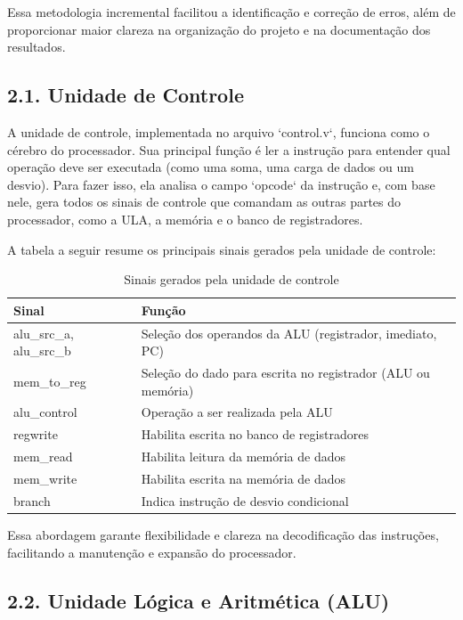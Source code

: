 \documentclass[12pt, a4paper]{article}
\begin{document}
Essa metodologia incremental facilitou a identificação e correção de erros, além de proporcionar maior clareza na organização do projeto e na documentação dos resultados.

\subsection*{2.1. Unidade de Controle}

A unidade de controle, implementada no arquivo `control.v`, funciona como o cérebro do processador. Sua principal função é ler a instrução para entender qual operação deve ser executada (como uma soma, uma carga de dados ou um desvio). Para fazer isso, ela analisa o campo `opcode` da instrução e, com base nele, gera todos os sinais de controle que comandam as outras partes do processador, como a ULA, a memória e o banco de registradores.

A tabela a seguir resume os principais sinais gerados pela unidade de controle:

\begin{table}[h!]
\centering
\caption{Sinais gerados pela unidade de controle}
\label{tab:controle_outputs}
\begin{tabular}{|l|p{8cm}|}
\hline
\textbf{Sinal} & \textbf{Função} \\ 
\hline
alu\_src\_a, alu\_src\_b & Seleção dos operandos da ALU (registrador, imediato, PC) \\
mem\_to\_reg & Seleção do dado para escrita no registrador (ALU ou memória) \\
alu\_control & Operação a ser realizada pela ALU \\
regwrite & Habilita escrita no banco de registradores \\
mem\_read & Habilita leitura da memória de dados \\
mem\_write & Habilita escrita na memória de dados \\
branch & Indica instrução de desvio condicional \\
\hline
\end{tabular}
\end{table}

Essa abordagem garante flexibilidade e clareza na decodificação das instruções, facilitando a manutenção e expansão do processador.

\subsection*{2.2. Unidade Lógica e Aritmética (ALU)}
\end{document}
